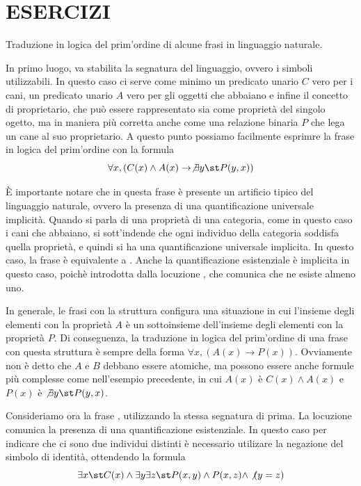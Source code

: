\section{ESERCIZI}

Traduzione in logica del prim'ordine di alcune frasi in linguaggio naturale.


In primo luogo, va stabilita la segnatura del linguaggio, ovvero i simboli utilizzabili. In questo caso ci serve come minimo un predicato unario \(C\) vero per i cani, un predicato unario \(A\) vero per gli oggetti che abbaiano e infine il concetto di proprietario, che può essere rappresentato sia come proprietà del singolo ogetto, ma in maniera più corretta anche come una relazione binaria \(P\) che lega un cane al suo proprietario.
A questo punto possiamo facilmente esprimre la frase in logica del prim'ordine con la formula
\[\forall x, (C(x) \land A(x) \to \not\exists y\st P(y,x))\]

È importante notare che in questa frase è presente un artificio tipico del linguaggio naturale, ovvero la presenza di una quantificazione universale implicità. Quando si parla di una proprietà di una categoria, come in questo caso i cani che abbaiano, si sott'indende che ogni individuo della categoria soddisfa quella proprietà, e quindi si ha una quantificazione universale implicita. In questo caso, la frase  è equivalente a . Anche la quantificazione esistenziale è implicita in questo caso, poichè introdotta dalla locuzione , che comunica che ne esiste almeno uno.

In generale, le frasi con la struttura  configura una situazione in cui l'insieme degli elementi con la proprietà \(A\) è un sottoinsieme dell'insieme degli elementi con la proprietà \(P\). Di conseguenza, la traduzione in logica del prim'ordine di una frase con questa struttura è sempre della forma \(\forall x, (A(x) \to P(x))\).
Ovviamente non è detto che \(A\) e \(B\) debbano essere atomiche, ma possono essere anche formule più complesse come nell'esempio precedente, in cui \(A(x)\) è \(C(x)\land A(x)\) e \(P(x)\) è \(\not\exists y\st P(y,x)\).

Consideriamo ora la frase , utilizzando la stessa segnatura di prima.
La locuzione  comunica la presenza di una quantificazione esistenziale. In questo caso per indicare che ci sono due individui distinti è necessario utilizare la negazione del simbolo di identità, ottendendo la formula
\[\exists x\st C(x) \land \exists y \exists z\st P(x,y) \land P(x,z) \land \not(y = z)\]

